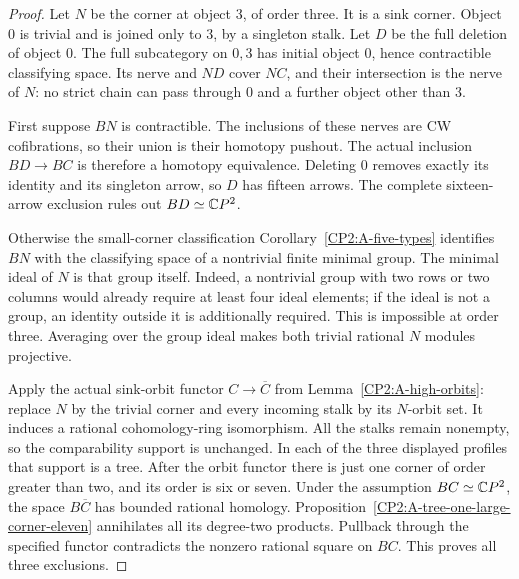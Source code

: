 \begin{proof}
Let $N$ be the corner at object $3$, of order three.
It is a sink corner. Object $0$ is trivial and is joined
only to $3$, by a singleton stalk. Let $D$ be the full
deletion of object $0$. The full subcategory on $0,3$
has initial object $0$, hence contractible classifying
space. Its nerve and $ND$ cover $NC$, and their intersection
is the nerve of $N$: no strict chain can pass through $0$
and a further object other than $3$.

First suppose $BN$ is contractible. The inclusions of
these nerves are CW cofibrations, so their union is their
homotopy pushout. The actual inclusion $BD\to BC$ is
therefore a homotopy equivalence. Deleting $0$ removes
exactly its identity and its singleton arrow, so $D$ has
fifteen arrows. The complete sixteen-arrow exclusion
rules out $BD\simeq\mathbb{C}P^2$.

Otherwise the small-corner classification
Corollary~\ref{CP2:A-five-types} identifies $BN$ with the
classifying space of a nontrivial finite minimal group.
The minimal ideal of $N$ is that group itself. Indeed,
a nontrivial group with two rows or two columns would
already require at least four ideal elements; if the
ideal is not a group, an identity outside it is additionally
required. This is impossible at order three. Averaging
over the group ideal makes both trivial rational $N$
modules projective.

Apply the actual sink-orbit functor
$C\to\overline C$ from Lemma~\ref{CP2:A-high-orbits}:
replace $N$ by the trivial corner and every incoming
stalk by its $N$-orbit set. It induces a rational
cohomology-ring isomorphism. All the stalks remain
nonempty, so the comparability support is unchanged.
In each of the three displayed profiles that support is
a tree. After the orbit functor there is just one corner
of order greater than two, and its order is six or seven.
Under the assumption $BC\simeq\mathbb{C}P^2$, the space
$B\overline C$ has bounded rational homology.
Proposition~\ref{CP2:A-tree-one-large-corner-eleven}
annihilates all its degree-two products. Pullback through
the specified functor contradicts the nonzero rational
square on $BC$. This proves all three exclusions.
\end{proof}

